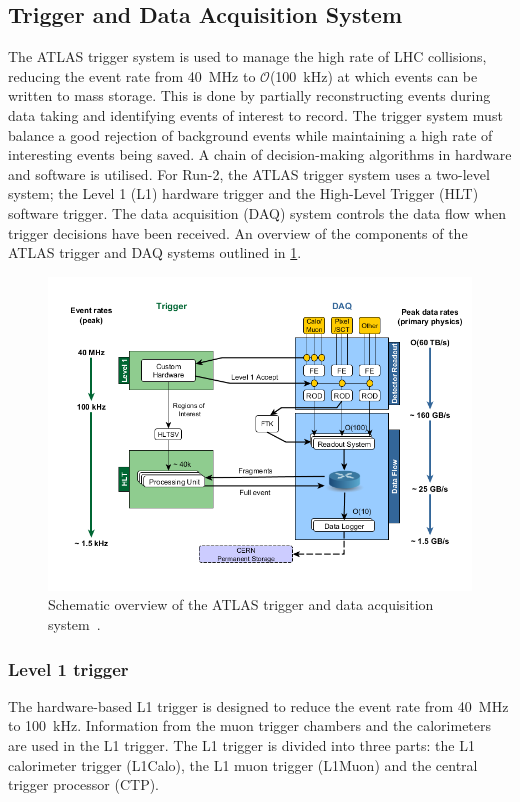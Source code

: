\subsection{Trigger and Data Acquisition System}\label{sec:method:ATLAS:trigger}
The ATLAS trigger system is used to manage the high rate of LHC collisions, reducing the event rate from \SI{40}{\mega\hertz} to $\mathcal{O}$(\SI{100}{\kilo\hertz}) at which events can be written to mass storage. This is done by partially reconstructing events during data taking and identifying events of interest to record. The trigger system must balance a good rejection of background events while maintaining a high rate of interesting events being saved. A chain of decision-making algorithms in hardware and software is utilised. For Run-2, the ATLAS trigger system uses a two-level system; the Level 1 (L1) hardware trigger and the High-Level Trigger (HLT) software trigger. The data acquisition (DAQ) system controls the data flow when trigger decisions have been received. An overview of the components of the ATLAS trigger and DAQ systems outlined in \cref{fig:method:ATLAS:TDAQ}.
\begin{figure}[!htpb]
    \centering
    \includegraphics[width=\largefigwidth]{images/tdaqFullNew2017.png}
    \caption[Overview of the ATLAS trigger and data acquisition system]{Schematic overview of the ATLAS trigger and data acquisition system~\cite{ATLAS:TDAQ-Run2}.}
    \label{fig:method:ATLAS:TDAQ}
\end{figure}

\subsubsection{Level 1 trigger}
The hardware-based L1 trigger is designed to reduce the event rate from \SI{40}{\mega\hertz} to \SI{100}{\kilo\hertz}. Information from the muon trigger chambers and the calorimeters are used in the L1 trigger. The L1 trigger is divided into three parts: the L1 calorimeter trigger (L1Calo), the L1 muon trigger (L1Muon) and the central trigger processor (CTP).

